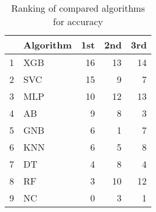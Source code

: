 \begin{table}
\footnotesize
\caption{Ranking of compared algorithms for accuracy}
\label{tab:places accuracy}
\begin{tabular}{llrrr}
\hline
 & Algorithm & 1st & 2nd & 3rd \\
\hline
1 & XGB & 16 & 13 & 14 \\
2 & SVC & 15 & 9 & 7 \\
3 & MLP & 10 & 12 & 13 \\
4 & AB & 9 & 8 & 3 \\
5 & GNB & 6 & 1 & 7 \\
6 & KNN & 6 & 5 & 8 \\
7 & DT & 4 & 8 & 4 \\
8 & RF & 3 & 10 & 12 \\
9 & NC & 0 & 3 & 1 \\
\hline
\end{tabular}
\end{table}
